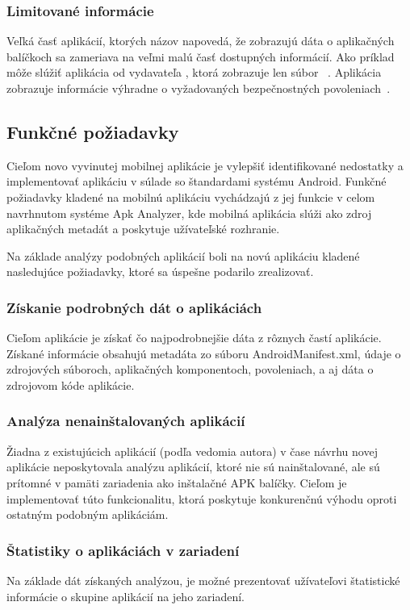 \subsubsection{\textbf{Limitované informácie}}
Veľká časť aplikácií, ktorých názov napovedá, že zobrazujú dáta o aplikačných balíčkoch sa zameriava na veľmi malú časť dostupných informácií. Ako príklad môže slúžiť aplikácia  od vydavateľa , ktorá zobrazuje len súbor ~\cite{kfOvdBmwje56iW6i}. Aplikácia  zobrazuje informácie výhradne o vyžadovaných bezpečnostných povoleniach~\cite{kfOvdBmwje56iW6i}.

\subsection{Funkčné požiadavky}
Cieľom novo vyvinutej mobilnej aplikácie je vylepšiť identifikované nedostatky a implementovať aplikáciu v súlade so štandardami systému Android. Funkčné požiadavky kladené na mobilnú aplikáciu vychádzajú z jej funkcie v celom navrhnutom systéme Apk Analyzer, kde mobilná aplikácia slúži ako zdroj aplikačných metadát a poskytuje užívateľské rozhranie.


Na základe analýzy podobných aplikácií boli na novú aplikáciu kladené nasledujúce požiadavky, ktoré sa úspešne podarilo zrealizovať.

\subsubsection{\textbf{Získanie podrobných dát o aplikáciách}}
Cieľom aplikácie je získať čo najpodrobnejšie dáta z rôznych častí aplikácie. Získané informácie obsahujú metadáta zo súboru AndroidManifest.xml, údaje o zdrojových súboroch, aplikačných komponentoch, povoleniach, a aj dáta o zdrojovom kóde aplikácie. 

\subsubsection{\textbf{Analýza nenainštalovaných aplikácií}}
Žiadna z existujúcich aplikácií (podľa vedomia autora) v čase návrhu novej aplikácie neposkytovala analýzu aplikácií, ktoré nie sú nainštalované, ale sú prítomné v pamäti zariadenia ako inštalačné APK balíčky. Cieľom je implementovať túto funkcionalitu, ktorá poskytuje konkurenčnú výhodu oproti ostatným podobným aplikáciám.

\subsubsection{\textbf{Štatistiky o aplikáciách v zariadení}}
Na základe dát získaných analýzou, je možné prezentovať užívateľovi štatistické informácie o skupine aplikácií na jeho zariadení.

